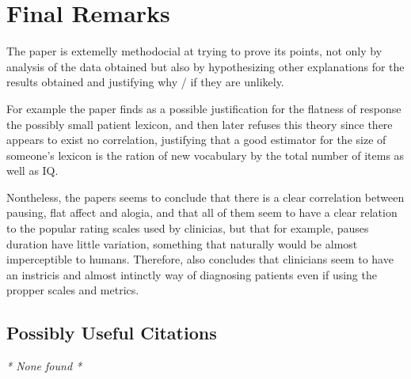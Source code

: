 \documentclass{Paper_Summary}
\begin{document}
\section{Final Remarks}
    
    The paper is extemelly methodocial at trying to prove its points, not only by analysis of the data obtained but also by hypothesizing other explanations for the results obtained and justifying why / if they are unlikely.

    For example the paper finds as a possible justification for the flatness of response the possibly small patient lexicon, and then later refuses this theory since there appears to exist no correlation, justifying that a good estimator for the size of someone's lexicon is the ration of new vocabulary by the total number of items as well as IQ.

    Nontheless, the papers seems to conclude that there is a clear correlation between pausing, flat affect and alogia, and that all of them seem to have a clear relation to the popular rating scales used by clinicias, but that for example, pauses duration have little variation, something that naturally would be almost imperceptible to humans. Therefore, also concludes that clinicians seem to have an instricis and almost intinctly way of diagnosing patients even if using the propper scales and metrics.

\breakline

\begin{center}
    \section*{Possibly Useful Citations}
\end{center}
\emph{* None found *}
\end{document}
